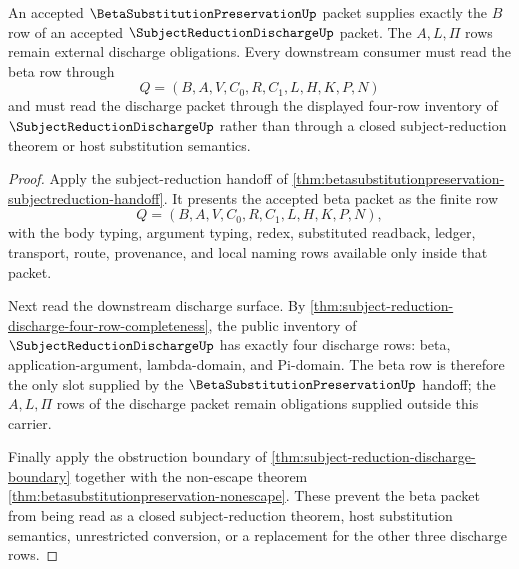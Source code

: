 \begin{theorem}
\label{thm:betasubstitutionpreservation-subjectreduction-four-row-consumption}
An accepted $\BetaSubstitutionPreservationUp$ packet supplies exactly the $B$ row of an accepted $\SubjectReductionDischargeUp$ packet. The $A,L,\Pi$ rows remain external discharge obligations. Every downstream consumer must read the beta row through
$$
Q=(B,A,V,C_0,R,C_1,L,H,K,P,N)
$$
and must read the discharge packet through the displayed four-row inventory of $\SubjectReductionDischargeUp$ rather than through a closed subject-reduction theorem or host substitution semantics.
\end{theorem}
\begin{proof}
Apply the subject-reduction handoff of \autoref{thm:betasubstitutionpreservation-subjectreduction-handoff}. It presents the accepted beta packet as the finite row
$$
Q=(B,A,V,C_0,R,C_1,L,H,K,P,N),
$$
with the body typing, argument typing, redex, substituted readback, ledger, transport, route, provenance, and local naming rows available only inside that packet.

Next read the downstream discharge surface. By \autoref{thm:subject-reduction-discharge-four-row-completeness}, the public inventory of $\SubjectReductionDischargeUp$ has exactly four discharge rows: beta, application-argument, lambda-domain, and Pi-domain. The beta row is therefore the only slot supplied by the $\BetaSubstitutionPreservationUp$ handoff; the $A,L,\Pi$ rows of the discharge packet remain obligations supplied outside this carrier.

Finally apply the obstruction boundary of \autoref{thm:subject-reduction-discharge-boundary} together with the non-escape theorem \autoref{thm:betasubstitutionpreservation-nonescape}. These prevent the beta packet from being read as a closed subject-reduction theorem, host substitution semantics, unrestricted conversion, or a replacement for the other three discharge rows.
\end{proof}

